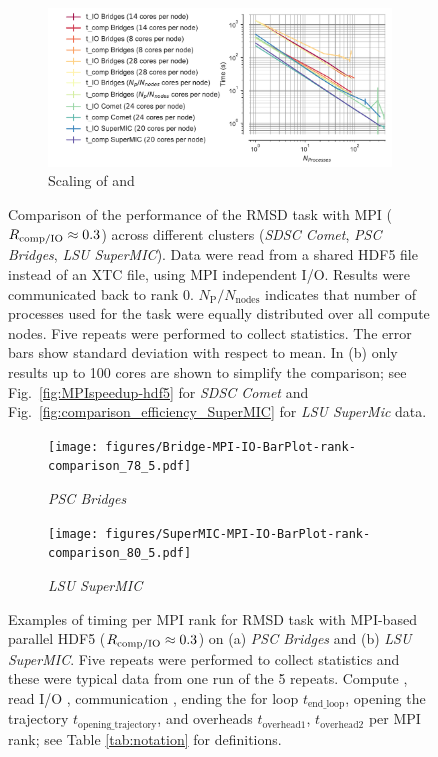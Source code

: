 \begin{figure}[!htb]
  \begin{subfigure} {\textwidth}
    \includegraphics[width=\linewidth]{figures/Clusters_IO_compute_scaling_edited.pdf}
    \captionsetup{format=hang}
    \caption{Scaling of \tcomp and \tIO}
    \label{fig:compute-IO-scaling-clusters}
  \end{subfigure}
  \caption{Comparison of the performance of the RMSD task with MPI ($R_{\text{comp/IO}} \approx 0.3$)  across different clusters (\emph{SDSC Comet}, \emph{PSC Bridges}, \emph{LSU SuperMIC}).
    Data were read from a shared HDF5 file instead of an XTC file, using MPI independent I/O.
    Results were communicated back to rank 0.
    $N_{\text{P}}/N_{\text{nodes}}$ indicates that number of processes used for the task were equally distributed over all compute nodes.
    Five repeats were performed to collect statistics.
    The error bars show standard deviation with respect to mean.
    In (b) only results up to 100 cores are shown to simplify the comparison; see Fig.~\protect\ref{fig:MPIspeedup-hdf5} for \emph{SDSC Comet} and Fig.~\protect\ref{fig:comparison_efficiency_SuperMIC} for \emph{LSU SuperMic} data.
  }
\label{fig:MPIwithIO-clusters}
\end{figure} 

\begin{figure}[!htb]
  \centering
  \begin{subfigure}{.49\textwidth}
    \texttt{[image: figures/Bridge-MPI-IO-BarPlot-rank-comparison\_78\_5.pdf]}
    \caption{\emph{PSC Bridges}}
    \label{fig:hdf5-bridge}
  \end{subfigure}
  \bigskip
  \begin{subfigure} {.49\textwidth}
    \texttt{[image: figures/SuperMIC-MPI-IO-BarPlot-rank-comparison\_80\_5.pdf]}
    \caption{\emph{LSU SuperMIC}}
    \label{fig:hdf5-SuperMIC}
  \end{subfigure}
  \caption{Examples of timing per MPI rank for RMSD task with MPI-based parallel HDF5 ($R_{\text{comp/IO}} \approx 0.3$) on (a) \emph{PSC Bridges} and (b) \emph{LSU SuperMIC}.
    Five repeats were performed to collect statistics and these were typical data from one run of the 5 repeats. Compute \tcomp, read I/O \tIO, communication \tcomm, ending the for loop $t_{\text{end\_loop}}$,  opening the trajectory $t_{\text{opening\_trajectory}}$, and overheads $t_{\text{overhead1}}$, $t_{\text{overhead2}}$ per MPI rank; see Table \ref{tab:notation} for definitions.}
  \label{fig:MPIwithIO-clusters-rank}
\end{figure} 

